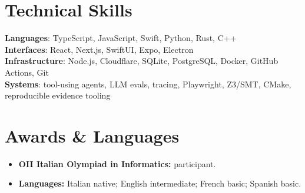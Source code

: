\documentclass[letterpaper,11pt]{article}
\newcommand{\resumeItem}[1]{\item\small{#1}}
\begin{document}
\section{Technical Skills}
\begin{itemize}[leftmargin=0.15in,label={}]
  \small{\item{
    \textbf{Languages}{: TypeScript, JavaScript, Swift, Python, Rust, C++} \\
    \textbf{Interfaces}{: React, Next.js, SwiftUI, Expo, Electron} \\
    \textbf{Infrastructure}{: Node.js, Cloudflare, SQLite, PostgreSQL, Docker, GitHub Actions, Git} \\
    \textbf{Systems}{: tool-using agents, LLM evals, tracing, Playwright, Z3/SMT, CMake, reproducible evidence tooling}
  }}
\end{itemize}
\vspace{-8pt}

\section{Awards \& Languages}
\begin{itemize}[leftmargin=0.15in,itemsep=0.4pt,topsep=0.5pt]
  \resumeItem{\textbf{OII Italian Olympiad in Informatics:} participant.}
  \resumeItem{\textbf{Languages:} Italian native; English intermediate; French basic; Spanish basic.}
\end{itemize}
\end{document}
